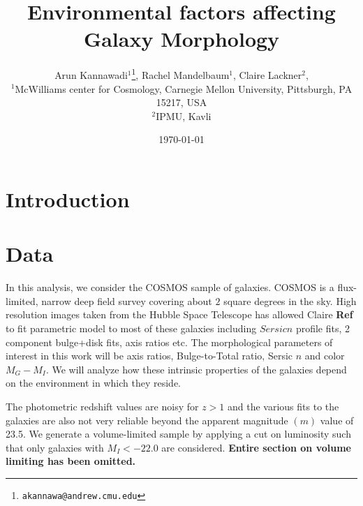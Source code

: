 \documentclass[twocolumn,useAMS,usenatbib]{mn2e}
\title[WL simulation]{Environmental factors affecting Galaxy Morphology}
\author[Kannawadi et al.]
{Arun Kannawadi$^1$\thanks{\tt akannawa@andrew.cmu.edu}, 
Rachel Mandelbaum$^1$,
Claire Lackner$^2$, 
\\$^1$McWilliams center for Cosmology, Carnegie Mellon University, Pittsburgh, PA 15217, USA
\\$^2$IPMU, Kavli
}
\date{\today}
\newcommand{\mg}{\ensuremath{M_G}}
\newcommand{\mi}{\ensuremath{M_I}}
\begin{document}
\maketitle

\begin{abstract}
 
\end{abstract}

\begin{keywords}
  
\end{keywords}

\section{Introduction}
\label{S:intro}

\section{Data}
\label{S:data}
In this analysis, we consider the COSMOS sample of galaxies. COSMOS is a flux-limited, narrow deep field survey covering about $2$ square degrees in the sky.
High resolution images taken from the Hubble Space Telescope has allowed Claire {\bf Ref} to fit parametric model to most of these galaxies including $Sersic n$ profile fits, 
2 component bulge+disk fits, axis ratios etc. The morphological parameters of interest in this work will be axis ratios, Bulge-to-Total ratio, Sersic $n$ and color $M_G-M_I$.
We will analyze how these intrinsic properties of the galaxies depend on the environment in which they reside.

The photometric redshift values are noisy for $z > 1$ and the various fits to the galaxies are also not very reliable beyond the apparent magnitude $(m)$ value of 23.5. 
We generate a volume-limited sample by applying a cut on luminosity such that only galaxies with $M_I < -22.0$ are considered. {\bf Entire section on volume limiting has been omitted.}
\end{document}
